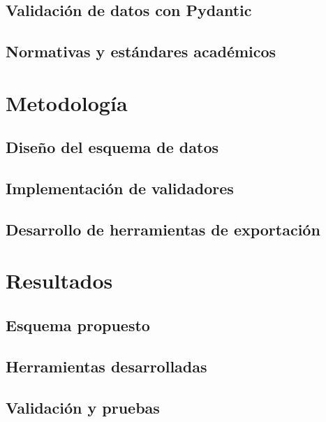 \documentclass[12pt,a4paper,twoside]{report}
\begin{document}
\section{Validación de datos con Pydantic}
\label{sec:pydantic}


\section{Normativas y estándares académicos}
\label{sec:estandares}


\chapter{Metodología}
\label{chap:metodologia}

\section{Diseño del esquema de datos}
\label{sec:diseno_esquema}


\section{Implementación de validadores}
\label{sec:implementacion_validadores}


\section{Desarrollo de herramientas de exportación}
\label{sec:herramientas_exportacion}


\chapter{Resultados}
\label{chap:resultados}

\section{Esquema propuesto}
\label{sec:esquema_propuesto}


\section{Herramientas desarrolladas}
\label{sec:herramientas_desarrolladas}


\section{Validación y pruebas}
\label{sec:validacion}
\end{document}
